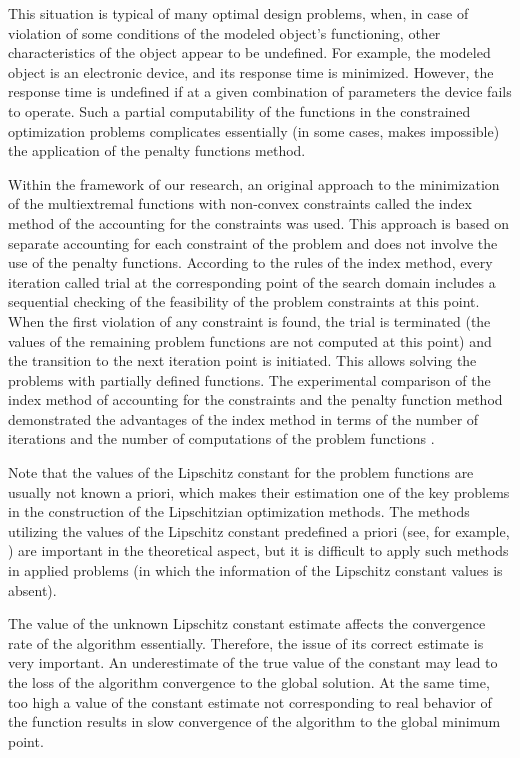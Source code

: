 \documentclass[review]{elsarticle}
\begin{document}
	This situation is typical of many optimal design problems, when, in case of violation of some conditions of the modeled object's functioning, other characteristics of the object appear to be undefined. For example, the modeled object is an electronic device, and its response time is minimized. However, the response time is undefined if at a given combination of parameters the device fails to operate. Such a partial computability of the functions in the constrained optimization problems complicates essentially (in some cases, makes impossible) the application of the penalty functions method. 
	
	Within the framework of our research, an original approach to the minimization of the multiextremal functions with non-convex constraints called the index method of the accounting for the constraints 
	\cite{Strongin2000,Pugliese,Barkalov2002,Strongin2003} 
was used. This approach is based on separate accounting for each constraint of the problem and does not involve the use of the penalty functions. According to the rules of the index method, every iteration called trial at the corresponding point of the search domain includes a sequential checking of the feasibility of the problem constraints at this point. When the first violation of any constraint is found, the trial is terminated (the values of the remaining problem functions are not computed at this point) and the transition to the next iteration point is initiated. This allows solving the problems with partially defined functions. The experimental comparison of the index method of accounting for the constraints and the penalty function method demonstrated the advantages of the index method in terms of the number of iterations and the number of computations of the problem functions \cite{Barkalov2017_1, Barkalov2017_2}.
	
	Note that the values of the Lipschitz constant for the problem functions are usually not known a priori, which  makes their estimation one of the key problems in the construction of the Lipschitzian optimization methods. The methods utilizing the values of the Lipschitz constant predefined a priori (see, for example, \cite{Piyavskii1972, Shubert1972, Wood1991, Meewella1988, Mladineo1986}) are important in the theoretical aspect, but it is difficult to apply such methods in applied problems (in which the information of the Lipschitz constant values is absent).
		
		The value of the unknown Lipschitz constant estimate affects the convergence rate of the algorithm essentially. Therefore, the issue of its correct estimate is very important. An underestimate of the true value of the constant may lead to the loss of the algorithm convergence to the global solution. At the same time, too high a value of the constant estimate not corresponding to real behavior of the function results in slow convergence of the algorithm to the global minimum point. 
		
\end{document}
